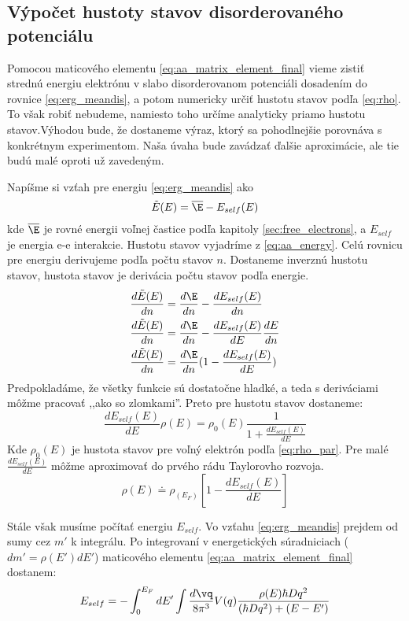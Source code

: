 \subsection{Výpočet hustoty stavov disorderovaného potenciálu}
Pomocou maticového elementu \eqref{eq:aa_matrix_element_final} vieme zistiť strednú energiu elektrónu v slabo disorderovanom potenciáli
dosadením do rovnice \eqref{eq:erg_meandis}, a potom numericky určiť hustotu stavov podľa \eqref{eq:rho}.
To však robiť nebudeme, namiesto toho určíme analyticky priamo hustotu stavov.Výhodou bude, že dostaneme výraz,
ktorý sa pohodlnejšie porovnáva s konkrétnym experimentom.
Naša úvaha bude zavádzať ďalšie aproximácie, ale tie budú malé oproti už zavedeným.

Napíšme si vzťah pre energiu \eqref{eq:erg_meandis} ako
\begin{equation}
 \label{eq:aa_energy}
 \tilde E(E)=\overline\E-E_{self}(E)
\end{equation}
kde $\overline\E$ je rovné energii voľnej častice podľa kapitoly \ref{sec:free_electrons}, a $E_{self}$
je energia e-e interakcie.
Hustotu stavov vyjadríme z \eqref{eq:aa_energy}. Celú rovnicu pre energiu derivujeme podľa počtu stavov $n$.
Dostaneme inverznú hustotu stavov, hustota stavov je derivácia počtu stavov podľa energie.
\begin{align}
  \frac{d\tilde E(E)}{dn}&=\frac{d\E}{dn}-\frac{dE_{self}(E)}{dn}\\ \notag
  \frac{d\tilde E(E)}{dn}&=\frac{d\E}{dn}-\frac{dE_{self}(E)}{dE}\frac{dE}{dn}\\ \notag
  \label{eq:aa_dos_invert}
  \frac{d\tilde E(E)}{dn}&=\frac{d\E}{dn}(1-\frac{dE_{self}(E)}{dE})
\end{align}
Predpokladáme, že všetky funkcie sú dostatočne hladké, a teda s deriváciami môžme pracovať ,,ako so zlomkami''.
Preto pre hustotu stavov dostaneme:
\begin{equation}\frac{dE_{self}(E)}{dE}
 \label{eq:aa_dos1}
 \rho(E)=\rho_0(E)\frac{1}{1+\frac{dE_{self}(E)}{dE}}
 \end{equation}
 Kde $\rho_0(E)$ je hustota stavov pre voľný elektrón podľa \eqref{eq:rho_par}.
 Pre malé $\frac{dE_{self}(E)}{dE}$ môžme aproximovať do prvého rádu Taylorovho rozvoja.
\begin{equation}
 \label{eq:aa_dos2}
 \rho(E)\doteq\rho_(E_F)[1-\frac{dE_{self}(E)}{dE}]
\end{equation}

Stále však musíme počítať energiu $E_{self}$.
Vo vzťahu \eqref{eq:erg_meandis} prejdem od sumy cez $m'$ k integrálu.
Po integrovaní v energetických súradniciach ($dm'=\rho(E')dE'$)  maticového elementu \eqref{eq:aa_matrix_element_final} dostanem:
\begin{equation}
 \label{eq:aa_self_energy}
 E_{self}=-\int_{0}^{E_F}dE' \int \frac{d\vq}{8\pi^3}V(q)\frac{\rho(E)\hbar D q^2}{(\hbar D q^2)+(E-E')}
\end{equation}


